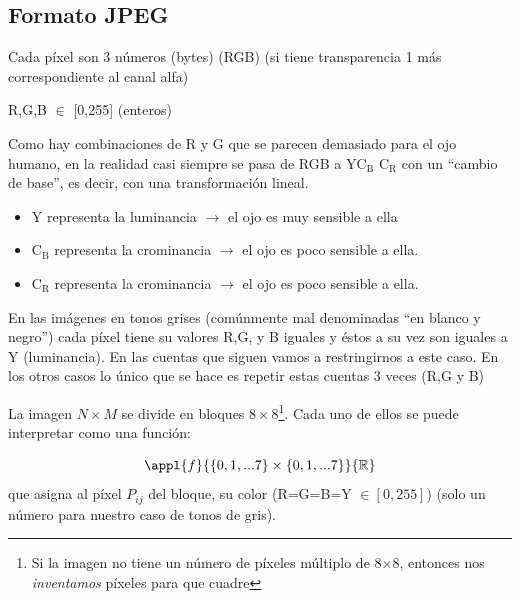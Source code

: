 	\subsection{Formato JPEG}

		\begin{center}
		\end{center}

		Cada píxel son 3 números (bytes) (RGB) (si tiene transparencia 1 más correspondiente al canal alfa)

		R,G,B $\in$ [0,255] (enteros)

		Como hay combinaciones de R y G que se parecen demasiado para el ojo humano, en la realidad casi siempre se pasa de RGB a Y$\text{C}_{\text{B}}$ $\text{C}_{\text{R}}$ con un ``cambio de base'', es decir, con una transformación lineal.

		\begin{itemize}
			\item Y representa la luminancia $\rightarrow$ el ojo es muy sensible a ella
			\item $\text{C}_{\text{B}}$ representa la crominancia $\rightarrow$ el ojo es poco sensible a ella.
			\item $\text{C}_{\text{R}}$ representa la crominancia $\rightarrow$ el ojo es poco sensible a ella.
		\end{itemize}



		En las imágenes en tonos grises (comúnmente mal denominadas ``en blanco y negro'') cada píxel tiene su valores R,G, y B iguales y éstos a su vez son iguales a Y (luminancia). En las cuentas que siguen vamos a restringirnos a este caso. En los otros casos lo único que se hace es repetir estas cuentas 3 veces (R,G y B)

		\begin{center}
		\end{center}

		La imagen $N \times M$ se divide en bloques $8 \times 8$\footnote{Si la imagen no tiene un número de píxeles múltiplo de 8×8, entonces nos \textit{inventamos} píxeles para que cuadre}. Cada uno de ellos se puede interpretar como una función:

		\[\appl{f}{\{0,1,...7\} \times \{0,1,...7\} }{\mathbb{R}}\]
		que asigna al píxel $P_{ij}$ del bloque, su color (R=G=B=Y $\in [0,255]$) (solo un número para nuestro caso de tonos de gris).


